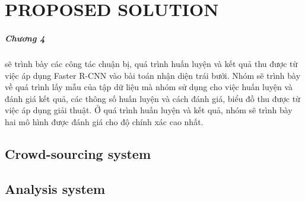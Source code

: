 \chapter{PROPOSED SOLUTION}
\label{chap:caseMedical}
\paragraph{Chương 4} sẽ trình bày các công tác chuận bị, quá trình huấn luyện và kết quả thu được từ việc áp dụng Faster R-CNN vào bài toán nhận diện trái bưởi. Nhóm sẽ trình bày về quá trình lấy mẫu của tập dữ liệu mà nhóm sử dụng cho việc huấn luyện và đánh giá kết quả, các thông số huấn luyện và cách đánh giá, biểu đồ thu được từ việc áp dụng giải thuật. Ở quá trình huấn luyện và kết quả, nhóm sẽ trình bày hai mô hình được đánh giá cho độ chính xác cao nhất. \\
\section{Crowd-sourcing system}
\section{Analysis system}
